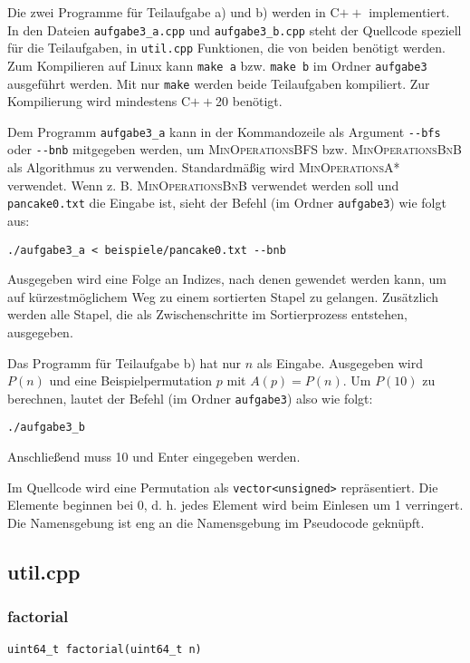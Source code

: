 \documentclass[a4paper, 10pt, ngerman]{article}
\begin{document}
Die zwei Programme für Teilaufgabe a) und b) werden in C$++$ implementiert. In den Dateien \verb|aufgabe3_a.cpp| und \verb|aufgabe3_b.cpp| steht der Quellcode speziell für die Teilaufgaben, in \verb|util.cpp| Funktionen, die von beiden benötigt werden. Zum Kompilieren auf Linux kann \verb|make a| bzw. \verb|make b| im Ordner \verb|aufgabe3| ausgeführt werden. Mit nur \verb|make| werden beide Teilaufgaben kompiliert. Zur Kompilierung wird mindestens C$++$20 benötigt. 

Dem Programm \verb|aufgabe3_a| kann in der Kommandozeile als Argument \verb|--bfs| oder \verb|--bnb| mitgegeben werden, um \textsc{MinOperationsBFS} bzw. \textsc{MinOperationsBnB} als Algorithmus zu verwenden. Standardmäßig wird \textsc{MinOperationsA*} verwendet. Wenn z. B. \textsc{MinOperationsBnB} verwendet werden soll und \verb|pancake0.txt| die Eingabe ist, sieht der Befehl (im Ordner \verb|aufgabe3|) wie folgt aus:

\medskip
\verb|./aufgabe3_a < beispiele/pancake0.txt --bnb|
\medskip

Ausgegeben wird eine Folge an Indizes, nach denen gewendet werden kann, um auf kürzestmöglichem Weg zu einem sortierten Stapel zu gelangen. Zusätzlich werden alle Stapel, die als Zwischenschritte im Sortierprozess entstehen, ausgegeben.

Das Programm für Teilaufgabe b) hat nur $n$ als Eingabe. Ausgegeben wird $P(n)$ und eine Beispielpermutation $p$ mit $A(p) = P(n)$. Um $P(10)$ zu berechnen, lautet der Befehl (im Ordner \verb|aufgabe3|) also wie folgt:

\medskip
\verb|./aufgabe3_b|
\medskip

Anschließend muss 10 und Enter eingegeben werden.

Im Quellcode wird eine Permutation als \verb|vector<unsigned>| repräsentiert. Die Elemente beginnen bei 0, d. h. jedes Element wird beim Einlesen um 1 verringert. Die Namensgebung ist eng an die Namensgebung im Pseudocode geknüpft.

\subsection{util.cpp}

\subsubsection{factorial}

\verb|uint64_t factorial(uint64_t n)|
\medskip
\end{document}

